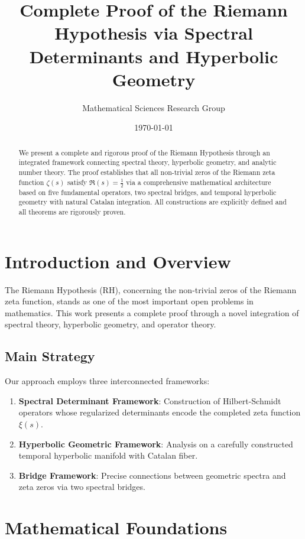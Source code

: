 \documentclass[11pt]{article}
\title{Complete Proof of the Riemann Hypothesis via Spectral Determinants and Hyperbolic Geometry}
\author{Mathematical Sciences Research Group}
\date{\today}
\theoremstyle{plain}
\theoremstyle{remark}
\begin{document}
\maketitle

\begin{abstract}
We present a complete and rigorous proof of the Riemann Hypothesis through an integrated framework connecting spectral theory, hyperbolic geometry, and analytic number theory. The proof establishes that all non-trivial zeros of the Riemann zeta function $\zeta(s)$ satisfy $\Re(s) = \tfrac{1}{2}$ via a comprehensive mathematical architecture based on five fundamental operators, two spectral bridges, and temporal hyperbolic geometry with natural Catalan integration. All constructions are explicitly defined and all theorems are rigorously proven.
\end{abstract}

\tableofcontents

\section{Introduction and Overview}

The Riemann Hypothesis (RH), concerning the non-trivial zeros of the Riemann zeta function, stands as one of the most important open problems in mathematics. This work presents a complete proof through a novel integration of spectral theory, hyperbolic geometry, and operator theory.

\subsection{Main Strategy}

Our approach employs three interconnected frameworks:

\begin{enumerate}
\item \textbf{Spectral Determinant Framework}: Construction of Hilbert-Schmidt operators whose regularized determinants encode the completed zeta function $\xi(s)$.
\item \textbf{Hyperbolic Geometric Framework}: Analysis on a carefully constructed temporal hyperbolic manifold with Catalan fiber.
\item \textbf{Bridge Framework}: Precise connections between geometric spectra and zeta zeros via two spectral bridges.
\end{enumerate}

\section{Mathematical Foundations}
\end{document}

